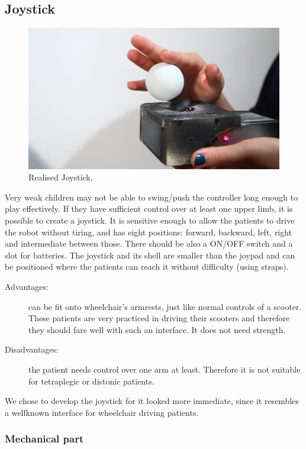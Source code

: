 \documentclass[a4paper,twoside]{book}
\begin{document}
\subsection{Joystick}

\begin{figure}[h]
\centering
\includegraphics[width=0.8\linewidth]{img/joystick} 
\caption{Realised Joystick.}
\end{figure}

\beforelist* Very weak children may not be able to swing/push the controller long enough to play effectively. If they have sufficient control over at least one upper limb, it is possible to create a joystick.
It is sensitive enough to allow the patients to drive the robot without tiring, and has eight positions: forward, backward, left, right and
intermediate between those.
There should be also a ON/OFF switch and a slot for batteries.
The joystick and its shell are smaller than the joypad and can be positioned where the patients can reach it without difficulty (using straps).
\begin{description}
\item[Advantages:] can be fit onto wheelchair's armrests, just like normal controls of a scooter. These patients are very practiced in driving their scooters and therefore they should fare well with such an interface. It does not need strength.
\item[Disadvantages:] the patient needs control over one arm at least. Therefore it is not suitable for tetraplegic or distonic patients.
\end{description}
\afterlist*
We chose to develop the joystick for it looked more immediate, since it resembles a well\textendash known interface for wheelchair driving patients.

\subsubsection{Mechanical part}
\end{document}
